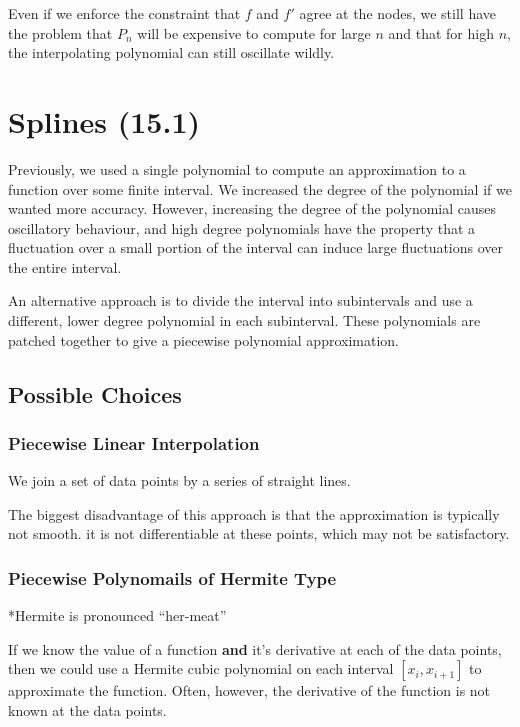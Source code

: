Even if we enforce the constraint that $f$ and $f'$ agree at the nodes, we still
have the problem that $P_n$ will be expensive to compute for large $n$ and that
for high $n$, the interpolating polynomial can still oscillate wildly.

\section{Splines (15.1)}

Previously, we used a single polynomial to compute an approximation to a
function over some finite interval. We increased the degree of the polynomial if
we wanted more accuracy. However, increasing the degree of the polynomial causes
oscillatory behaviour, and high degree polynomials have the property that a
fluctuation over a small portion of the interval can induce large fluctuations
over the entire interval.

An alternative approach is to divide the interval into subintervals and use a
different, lower degree polynomial in each subinterval. These polynomials are
patched together to give a piecewise polynomial approximation. 

\subsection{Possible Choices}
 
\subsubsection{Piecewise Linear Interpolation}

We join a set of data points by a series of straight lines.

The biggest disadvantage of this approach is that the approximation is typically
not smooth. \ie it is not differentiable at these points, which may not be
satisfactory.

\subsubsection{Piecewise Polynomails of Hermite Type}

*Hermite is pronounced \enquote{her-meat}

If we know the value of a function \textbf{and} it's derivative at each of the
data points, then we could use a Hermite cubic polynomial on each interval
$[x_i, x_{i+1}]$ to approximate the function. Often, however, the derivative of
the function is not known at the data points.

